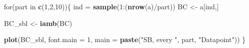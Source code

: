 \documentclass[]{article}
\newenvironment{Shaded}{\begin{snugshade}}{\end{snugshade}}
\newcommand{\KeywordTok}[1]{\textcolor[rgb]{0.13,0.29,0.53}{\textbf{{#1}}}}
\newcommand{\DataTypeTok}[1]{\textcolor[rgb]{0.13,0.29,0.53}{{#1}}}
\newcommand{\DecValTok}[1]{\textcolor[rgb]{0.00,0.00,0.81}{{#1}}}
\newcommand{\StringTok}[1]{\textcolor[rgb]{0.31,0.60,0.02}{{#1}}}
\newcommand{\NormalTok}[1]{{#1}}
\begin{document}
\begin{Shaded}
\begin{Highlighting}[]
\NormalTok{for(part in }\KeywordTok{c}\NormalTok{(}\DecValTok{1}\NormalTok{,}\DecValTok{2}\NormalTok{,}\DecValTok{10}\NormalTok{))\{}
    \NormalTok{ind =}\StringTok{ }\KeywordTok{sample}\NormalTok{(}\DecValTok{1}\NormalTok{:(}\KeywordTok{nrow}\NormalTok{(a)/part))}
    \NormalTok{BC <-}\StringTok{ }\NormalTok{a[ind,]}
    
    \NormalTok{BC_sbl <-}\StringTok{ }\KeywordTok{iamb}\NormalTok{(BC)}

    \KeywordTok{plot}\NormalTok{(BC_sbl,  }\DataTypeTok{font.main =} \DecValTok{1}\NormalTok{, }\DataTypeTok{main =} \KeywordTok{paste}\NormalTok{(}\StringTok{"SB, every "}\NormalTok{, part, }\StringTok{"Datapoint"}\NormalTok{))}
\NormalTok{\}}
\end{Highlighting}
\end{Shaded}
\end{document}
